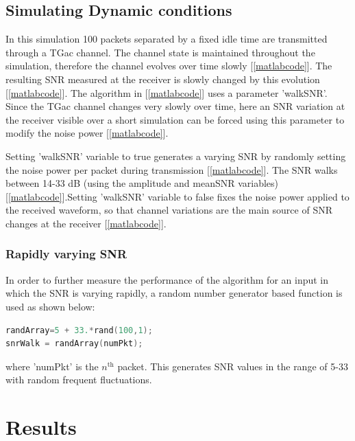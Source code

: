 \documentclass[a4paper, 10pt, conference]{ieeeconf}
\begin{document}
\subsection{Simulating Dynamic conditions}

In this simulation 100 packets separated by a fixed idle time are transmitted through a TGac channel. The channel state is maintained throughout the simulation, therefore the channel evolves over time slowly [\ref{matlabcode}]. The resulting SNR measured at the receiver is slowly changed by this evolution [\ref{matlabcode}]. The algorithm in [\ref{matlabcode}] uses a parameter 'walkSNR'. Since the TGac channel changes very slowly over time, here an SNR variation at the receiver visible over a short simulation can be forced using this parameter to modify the noise power [\ref{matlabcode}].

Setting 'walkSNR' variable to true generates a varying SNR by randomly setting the noise power per packet during transmission [\ref{matlabcode}]. The SNR walks between 14-33 dB (using the amplitude and meanSNR variables) [\ref{matlabcode}].Setting 'walkSNR' variable to false fixes the noise power applied to the received waveform, so that channel variations are the main source of SNR changes at the receiver [\ref{matlabcode}].\\

\subsubsection{Rapidly varying SNR}
In order to further measure the performance of the algorithm for an input in which the SNR is varying rapidly, a random number generator based function is used as shown below:

\begin{lstlisting}[language=C]
randArray=5 + 33.*rand(100,1);
snrWalk = randArray(numPkt); 
\end{lstlisting}

where 'numPkt' is the $n^{\text{th}}$ packet. This generates SNR values in the range of 5-33 with random frequent fluctuations.

\section{Results}
\end{document}
